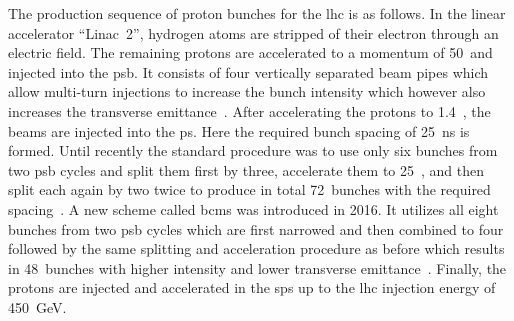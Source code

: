 
The production sequence of proton bunches for the \gls{lhc} is as follows. In the linear accelerator ``Linac~2'', hydrogen atoms are stripped of their electron through an electric field. The remaining protons are accelerated to a momentum of 50~\MeV and injected into the \gls{psb}. It consists of four vertically separated beam pipes which allow multi-turn injections to increase the bunch intensity which however also increases the transverse emittance~\cite{doi:10.1142/S0217751X13300196}. After accelerating the protons to 1.4~\GeV, the beams are injected into the \gls{ps}. Here the required bunch spacing of 25~ns is formed. Until recently the standard procedure was to use only six bunches from two \gls{psb} cycles and split them first by three, accelerate them to 25~\GeV, and then split each again by two twice to produce in total 72~bunches with the required spacing~\cite{Benedikt:2001ar}. A new scheme called \gls{bcms} was introduced in 2016. It utilizes all eight bunches from two \gls{psb} cycles which are first narrowed and then combined to four followed by the same splitting and acceleration procedure as before which results in 48~bunches with higher intensity and lower transverse emittance~\cite{bcms}. Finally, the protons are injected and accelerated in the \gls{sps} up to the \gls{lhc} injection energy of 450~GeV.


